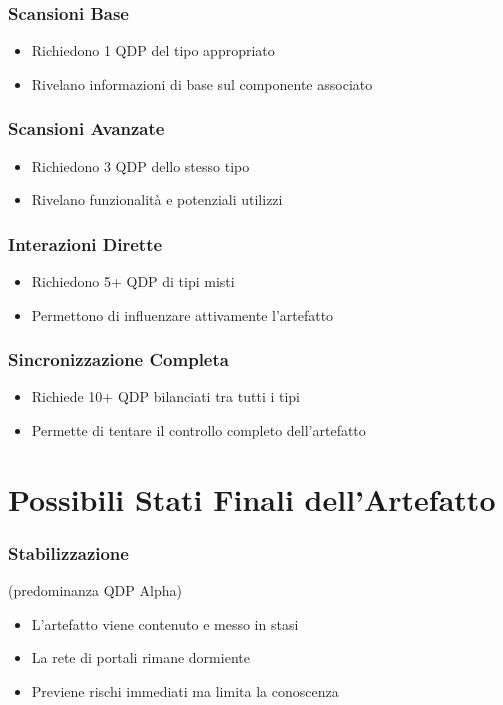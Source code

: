 \documentclass[letterpaper,twocolumn,openany,nodeprecatedcode]{dndbook}
\begin{document}
\subsubsection{Scansioni Base}
   \begin{itemize}
       \item Richiedono 1 QDP del tipo appropriato
       \item Rivelano informazioni di base sul componente associato
   \end{itemize}

\subsubsection{Scansioni Avanzate}
   \begin{itemize}
       \item Richiedono 3 QDP dello stesso tipo
       \item Rivelano funzionalità e potenziali utilizzi
   \end{itemize}

\subsubsection{Interazioni Dirette}
   \begin{itemize}
       \item Richiedono 5+ QDP di tipi misti
       \item Permettono di influenzare attivamente l'artefatto
   \end{itemize}

\subsubsection{Sincronizzazione Completa}
   \begin{itemize}
       \item Richiede 10+ QDP bilanciati tra tutti i tipi
       \item Permette di tentare il controllo completo dell'artefatto
   \end{itemize}

\section{Possibili Stati Finali dell'Artefatto}

\subsubsection{Stabilizzazione} (predominanza QDP Alpha)
   \begin{itemize}
       \item L'artefatto viene contenuto e messo in stasi
       \item La rete di portali rimane dormiente
       \item Previene rischi immediati ma limita la conoscenza
   \end{itemize}
\end{document}
